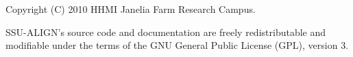 \vspace*{\fill}
\begin{flushleft}
Copyright (C) 2010 HHMI Janelia Farm Research Campus.

\vspace{2em} 

SSU-ALIGN's source code and documentation are freely
redistributable and modifiable under the terms of the GNU General
Public License (GPL), version 3.
\end{flushleft}
